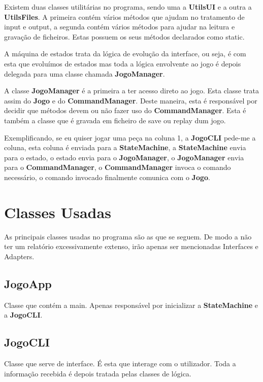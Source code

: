 \documentclass[11pt]{article}
\begin{document}
	Existem duas classes utilitárias no programa, sendo uma a \textbf{UtilsUI} e a outra a \textbf{UtilsFiles}. A primeira contém vários métodos que ajudam no tratamento de input e output, a segunda contém vários métodos para ajudar na leitura e gravação de ficheiros. Estas possuem os seus métodos declarados como static.
	
	A máquina de estados trata da lógica de evolução da interface, ou seja, é com esta que evoluímos de estados mas toda a lógica envolvente ao jogo é depois delegada para uma classe chamada \textbf{JogoManager}.
	
	A classe \textbf{JogoManager} é a primeira a ter acesso direto ao jogo. Esta classe trata assim do \textbf{Jogo} e do \textbf{CommandManager}. Deste maneira, esta é responsável por decidir que métodos devem ou não fazer uso do \textbf{CommandManager}. Esta é também a classe que é gravada em ficheiro de save ou replay dum jogo.
	
	Exemplificando, se eu quiser jogar uma peça na coluna 1, a \textbf{JogoCLI} pede-me a coluna, esta coluna é enviada para a \textbf{StateMachine}, a \textbf{StateMachine} envia para o estado, o estado envia para o \textbf{JogoManager}, o \textbf{JogoManager} envia para o \textbf{CommandManager}, o \textbf{CommandManager} invoca o comando necessário, o comando invocado finalmente comunica com o \textbf{Jogo}.
	
	
	\large
	\section{Classes Usadas}
	\normalsize
	
	As principais classes usadas no programa são as que se seguem. De modo a não ter um relatório excessivamente extenso, irão apenas ser mencionadas Interfaces e Adapters.
	
	\large
	\subsection{JogoApp}
	\normalsize

	Classe que contém a main. Apenas responsável por inicializar a \textbf{StateMachine} e a \textbf{JogoCLI}.
	
	
	\large
	\subsection{JogoCLI}
	\normalsize
	
	Classe que serve de interface. É esta que interage com o utilizador. Toda a informação recebida é depois tratada pelas classes de lógica.
	
\end{document}
